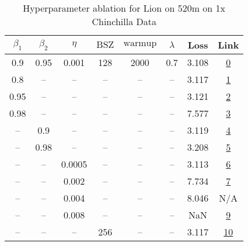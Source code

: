 \begin{table}[H]
\centering
\caption{Hyperparameter ablation for Lion on 520m on 1x Chinchilla Data}
\label{tab:ablation_lion_520m_1}
\begin{tabular}{cccccccc}
\toprule
$\beta_1$ & $\beta_2$ & $\eta$ & $\mathrm{BSZ}$ & $\mathrm{warmup}$ & $\lambda$ & Loss & Link \\
\midrule
0.9 & 0.95 & 0.001 & 128 & 2000 & 0.7 & 3.108 & \href{https://wandb.ai/stanford-mercury/optimizer-scaling/runs/sweep-520m-10B-liond8061alr0.001-wd0.7-minlr0-warmup2000-b10.9-b-942db7}{0} \\
\midrule
0.8 & -- & -- & -- & -- & -- & 3.117 & \href{https://wandb.ai/stanford-mercury/optimizer-scaling/runs/sweep-520m-10B-lion6ebc4dlr0.001-wd0.7-minlr0-warmup2000-b10.8-b-edd66c}{1} \\
0.95 & -- & -- & -- & -- & -- & 3.121 & \href{https://wandb.ai/stanford-mercury/optimizer-scaling/runs/sweep-520m-10B-lion6ee825lr0.001-wd0.7-minlr0-warmup2000-b10.95--60d07d}{2} \\
0.98 & -- & -- & -- & -- & -- & 7.577 & \href{https://wandb.ai/stanford-mercury/optimizer-scaling/runs/sweep-520m-10B-lion98635alr0.001-wd0.7-minlr0-warmup2000-b10.98--391c82}{3} \\
-- & 0.9 & -- & -- & -- & -- & 3.119 & \href{https://wandb.ai/stanford-mercury/optimizer-scaling/runs/sweep-520m-10B-lioncda5edlr0.001-wd0.7-minlr0-warmup2000-b10.9-b-2427cd}{4} \\
-- & 0.98 & -- & -- & -- & -- & 3.208 & \href{https://wandb.ai/stanford-mercury/optimizer-scaling/runs/sweep-520m-10B-lion489f64lr0.001-wd0.7-minlr0-warmup2000-b10.9-b-5ffcf2}{5} \\
-- & -- & 0.0005 & -- & -- & -- & 3.113 & \href{https://wandb.ai/stanford-mercury/optimizer-scaling/runs/sweep-520m-10B-lionfc33e8lr0.0005-wd0.7-minlr0-warmup2000-b10.9--6dcec6}{6} \\
-- & -- & 0.002 & -- & -- & -- & 7.734 & \href{https://wandb.ai/stanford-mercury/optimizer-scaling/runs/sweep-520m-10B-lion2ece3elr0.002-wd0.7-minlr0-warmup2000-b10.9-b-cce61a}{7} \\
-- & -- & 0.004 & -- & -- & -- & 8.046 & N/A \\
-- & -- & 0.008 & -- & -- & -- & NaN & \href{https://wandb.ai/stanford-mercury/optimizer-scaling/runs/sweep-520m-10B-lionbfc5e9lr0.008-wd0.7-minlr0-warmup2000-b10.9-b-2bcac3}{9} \\
-- & -- & -- & 256 & -- & -- & 3.117 & \href{https://wandb.ai/stanford-mercury/optimizer-scaling/runs/sweep-520m-10B-lione0352dlr0.001-wd0.7-minlr0-warmup2000-b10.9-b-d88a55}{10} \\

\end{tabular}
\end{table}
